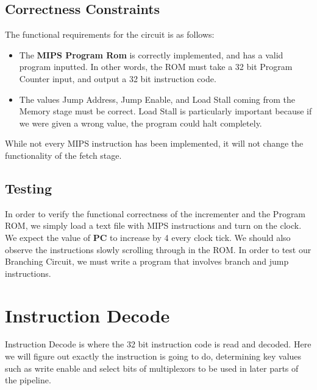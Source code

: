 \documentclass{article}
\begin{document}
\subsection{Correctness Constraints}
The functional requirements for the circuit is as follows:
\begin{itemize}
\item
The \textbf{MIPS Program Rom} is correctly implemented, and has a valid program inputted. In other words, the ROM must take a 32 bit Program Counter input, and output a 32 bit instruction code. 

\item
The values Jump Address, Jump Enable, and Load Stall coming from the Memory stage must be correct. Load Stall is particularly important because if we were given a wrong value, the program could halt completely.
\end{itemize}
While not every MIPS instruction has been implemented, it will not change the functionality of the fetch stage. 

\subsection{Testing}
In order to verify the functional correctness of the incrementer and the Program ROM, we simply load a text file with MIPS instructions and turn on the clock. We expect the value of \textbf{PC} to increase by 4 every clock tick. We should also observe the instructions slowly scrolling through in the ROM. In order to test our Branching Circuit, we must write a program that involves branch and jump instructions.

\section{Instruction Decode}
Instruction Decode is where the 32 bit instruction code is read and decoded. Here we will figure out exactly the instruction is going to do, determining key values such as write enable and select bits of multiplexors to be used in later parts of the pipeline. 
\end{document}
